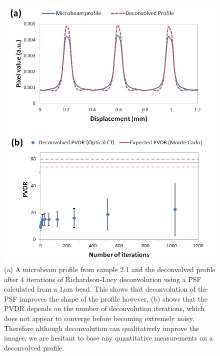\documentclass[12pt]{article}
\begin{document}
\begin{figure}
\centering
\includegraphics[width=0.85\linewidth]{Fig8}
\caption{(a) A microbeam profile from sample 2.1 and the deconvolved profile after 4 iterations of Richardson-Lucy deconvolution using a PSF calculated from a 1$\mu$m bead. This shows that deconvolution of the PSF improves the shape of the profile however, (b) shows that the PVDR depends on the number of deconvolution iterations, which does not appear to converge before becoming extremely noisy. Therefore although deconvolution can qualitatively improve the images, we are hesitant to base any quantitative measurements on a deconvolved profile.}
\label{fig:Fig8}
\end{figure}
\end{document}
